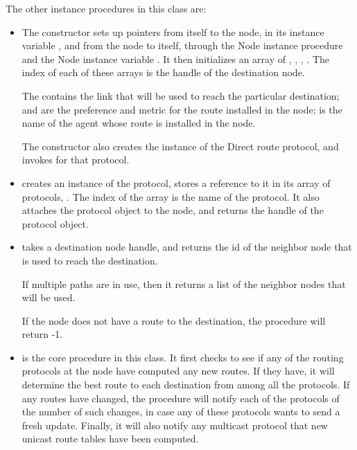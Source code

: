 The other instance procedures in this class are:
\begin{itemize}
\item {}
The constructor sets up pointers from itself to the node,
in its instance variable , and from the node to itself,
through the Node instance procedure
 and the Node instance variable .
It then initializes an array of
, , , .
The index of each of these arrays is the handle of the destination node.

The  contains the link that will be used to reach the
particular destination;
 and  are
the preference and metric for the route installed in the node;
 is the name of the agent whose route is installed in the node.

The constructor also creates the instance of the Direct route protocol,
and invokes  for that protocol.

\item
{}
creates an instance of the protocol, stores a reference to it
in its array of protocols, .
The index of the array is the name of the protocol.
It also attaches the protocol object to the node,
and returns the handle of the protocol object.

\item {}
takes a destination node handle, and returns the id of the neighbor node
that is used to reach the destination.

If multiple paths are in use, then it returns a list of the
neighbor nodes that will be used.

If the node does not have a route to the destination,
the procedure will return -1.

\item
{}
is the core procedure in this class.
It first checks to see if any of the routing protocols
at the node have computed any new routes.
If they have,
it will determine the best route to each destination
from among all the protocols.
If any routes have changed,
the procedure will notify each of the protocols of the number of
such changes, in case any of these protocols wants to send a fresh update.
Finally, it will also notify any multicast protocol that new unicast route
tables have been computed.


\end{itemize}
